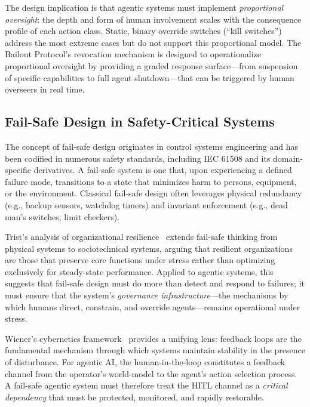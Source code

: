 The design implication is that agentic systems must implement \emph{proportional oversight}: the depth and form of human involvement scales with the consequence profile of each action class. Static, binary override switches (``kill switches'') address the most extreme cases but do not support this proportional model. The Bailout Protocol's revocation mechanism is designed to operationalize proportional oversight by providing a graded response surface---from suspension of specific capabilities to full agent shutdown---that can be triggered by human overseers in real time.

\subsection{Fail-Safe Design in Safety-Critical Systems}

The concept of fail-safe design originates in control systems engineering and has been codified in numerous safety standards, including IEC 61508 and its domain-specific derivatives. A fail-safe system is one that, upon experiencing a defined failure mode, transitions to a state that minimizes harm to persons, equipment, or the environment. Classical fail-safe design often leverages physical redundancy (e.g., backup sensors, watchdog timers) and invariant enforcement (e.g., dead man's switches, limit checkers).

Trist's analysis of organizational resilience~\cite{tristr81} extends fail-safe thinking from physical systems to sociotechnical systems, arguing that resilient organizations are those that preserve core functions under stress rather than optimizing exclusively for steady-state performance. Applied to agentic systems, this suggests that fail-safe design must do more than detect and respond to failures; it must ensure that the system's \emph{governance infrastructure}---the mechanisms by which humans direct, constrain, and override agents---remains operational under stress.

Wiener's cybernetics framework~\cite{wiener1948} provides a unifying lens: feedback loops are the fundamental mechanism through which systems maintain stability in the presence of disturbance. For agentic AI, the human-in-the-loop constitutes a feedback channel from the operator's world-model to the agent's action selection process. A fail-safe agentic system must therefore treat the HITL channel as a \emph{critical dependency} that must be protected, monitored, and rapidly restorable.

